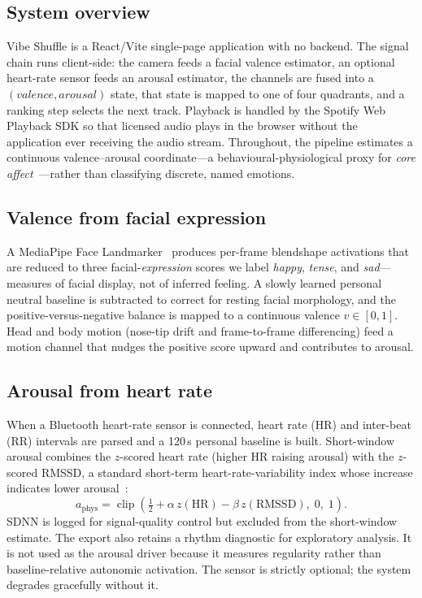 \subsection{System overview}
Vibe Shuffle is a React/Vite single-page application with no backend. The signal
chain runs client-side: the camera feeds a facial valence estimator, an optional
heart-rate sensor feeds an arousal estimator, the channels are fused into a
$(\textit{valence}, \textit{arousal})$ state, that state is mapped to one of four
quadrants, and a ranking step selects the next track. Playback is handled by the
Spotify Web Playback SDK so that licensed audio plays in the browser without the
application ever receiving the audio stream. Throughout, the pipeline estimates a
continuous valence--arousal coordinate---a behavioural-physiological proxy for
\emph{core affect}~\cite{russell1980}---rather than classifying discrete, named
emotions.

\subsection{Valence from facial expression}
A MediaPipe Face Landmarker~\cite{mediapipe2019} produces per-frame blendshape
activations that are reduced to three facial-\emph{expression} scores we label
\emph{happy}, \emph{tense}, and \emph{sad}---measures of facial display, not of
inferred feeling. A slowly learned personal neutral baseline is subtracted to correct for
resting facial morphology, and the positive-versus-negative balance is mapped to a
continuous valence $v \in [0,1]$. Head and body motion (nose-tip drift and
frame-to-frame differencing) feed a motion channel that nudges the positive score
upward and contributes to arousal.

\subsection{Arousal from heart rate}
When a Bluetooth heart-rate sensor is connected, heart rate (HR) and inter-beat
(RR) intervals are parsed and a 120\,s personal baseline is built. Short-window
arousal combines the $z$-scored heart rate (higher HR raising arousal) with the
$z$-scored RMSSD, a standard short-term heart-rate-variability index whose
increase indicates lower arousal~\cite{shaffer2017}:
\begin{equation}
a_{\mathrm{phys}} = \operatorname{clip}\!\left(\tfrac{1}{2}
+ \alpha\, z(\mathrm{HR}) - \beta\, z(\mathrm{RMSSD}),\; 0,\; 1\right).
\end{equation}
SDNN is logged for signal-quality control but excluded from the short-window
estimate. The export also retains a rhythm diagnostic for exploratory analysis.
It is not used as the arousal driver because it measures regularity rather than
baseline-relative autonomic activation. The sensor is strictly optional; the
system degrades gracefully without it.

